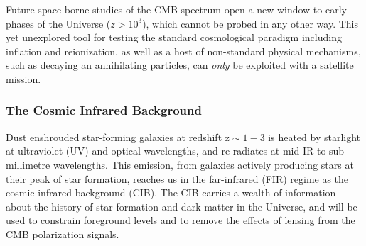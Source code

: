Future space-borne studies of the CMB spectrum open a new window to early phases of the Universe ($z > 10^3$), 
which cannot be probed in any other way. This yet unexplored tool for testing the standard cosmological paradigm 
including inflation and reionization, 
as well as a host of non-standard physical mechanisms, such as decaying an annihilating particles, 
can {\it only} be exploited with a satellite mission. 


\vspace{-0.15in}
\subsubsection{The Cosmic Infrared Background}
\vspace{-0.05in}


Dust enshrouded star-forming galaxies at redshift $\mathrm{z\sim 1-3}$ is heated by starlight at ultraviolet (UV) and optical wavelengths,
and re-radiates at mid-IR to sub-millimetre wavelengths. This emission, from galaxies actively
producing stars at their peak of star formation, reaches us in the far-infrared (FIR) regime as the cosmic infrared
background (CIB). The CIB carries a wealth of information about the history of star formation and dark matter 
in the Universe, and will be used to constrain foreground levels and to remove the effects of lensing 
from the CMB polarization signals. 


